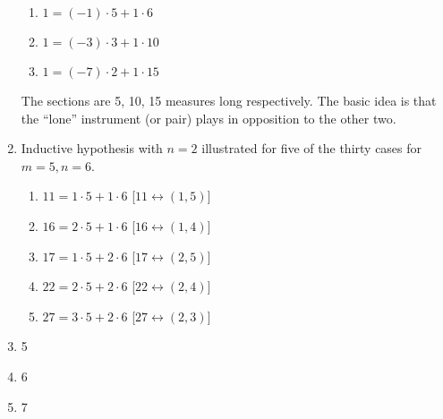 \documentclass[12pt]{article}
\begin{document}
\begin{enumerate}
\begin{enumerate}
\item $1 = (-1)\cdot 5 + 1\cdot 6$
\item $1 = (-3)\cdot 3 + 1\cdot 10$
\item $1 = (-7)\cdot 2 + 1\cdot 15$
\end{enumerate}

The sections are 5, 10, 15 measures long respectively. The basic idea
is that the ``lone'' instrument (or pair) plays in opposition to the
other two.

\item Inductive hypothesis with $n=2$ illustrated for five of the
  thirty cases for $m = 5, n = 6$.

\begin{enumerate}
\item $11 = 1\cdot 5 + 1\cdot 6$ [$11 \leftrightarrow (1,5)]$
\item $16 = 2\cdot 5 + 1\cdot 6$ [$16 \leftrightarrow (1,4)]$
\item $17 = 1\cdot 5 + 2\cdot 6$ [$17 \leftrightarrow (2,5)]$
\item $22 = 2\cdot 5 + 2\cdot 6$ [$22 \leftrightarrow (2,4)]$
\item $27 = 3\cdot 5 + 2\cdot 6$ [$27 \leftrightarrow (2,3)]$
\end{enumerate}

\item 5
\item 6
\item 7

\end{enumerate}
\end{document}
